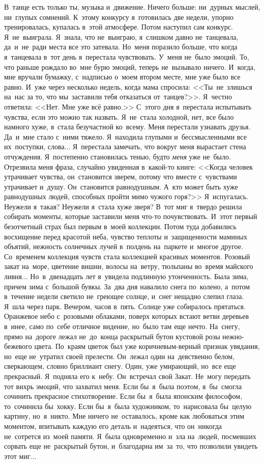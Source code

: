 В~танце есть только ты, музыка и~движение.
Ничего больше: ни~дурных мыслей, ни~глупых сомнений.
К~этому конкурсу я~готовилась две недели, упорно тренировалась, купалась в~этой атмосфере.
Потом наступил сам конкурс.
Я~не~выиграла.
Я~знала, что не~выиграю, я~слишком давно не~танцевала, да~и~не~ради места все это затевала.
Но~меня поразило больше, что когда я~танцевала в~тот день я~перестала чувствовать.
У~меня не~было эмоций.
То, что раньше рождало во~мне бурю эмоций, теперь не~вызывало ничего.
И~когда, мне вручали бумажку, с~надписью о~моем втором месте, мне уже было все равно.
И~уже через несколько недель, когда мама спросила: <<Ты~не~злишься на~нас за то, что мы~заставили тебя отказаться от~танцев?>>.
Я~честно ответила: <<Нет.
Мне уже всё равно.>>
С~этого дня я~перестала испытывать чувства, если это можно так назвать.
Я~не~стала холодной, нет, все было намного хуже, я~стала безучастной ко~всему.
Меня перестали узнавать друзья.
Да~и~мне стало с~ними тяжело.
Я~находила глупыми и~бессмысленными все их~поступки, слова... Я~перестала замечать, что вокруг меня вырастает стена отчуждения.
Я~постепенно становилась тенью, будто \textit{меня} уже не~было.
Отрезвила меня фраза, случайно увиденная в~какой-то книге: <<Когда человек утрачивает чувства, он~становится зверем, потому что вместе с~чувствами утрачивает и~душу.
Он~становится равнодушным.
А~кто может быть хуже равнодушных людей, способных пройти мимо чужого горя?>>
Я~испугалась.
Неужели я~такая? Неужели я~стала хуже зверя? В~тот миг я~твердо решила собирать моменты, которые заставили меня что-то почувствовать.
И~этот первый безотчетный страх был первым в~моей коллекции.
Потом туда добавились восхищение перед красотой неба, чувство теплоты и~защищенности маминых объятий, нежность солнечных лучей в~полдень на~паркете и~многое другое.
Со~временем коллекция чувств стала коллекцией красивых моментов.
Розовый закат на~море, цветение вишни, волосы на~ветру, тюльпаны во~время майского ливня... Но~в~двенадцать лет я~увидела подлинную утонченность.
Была зима, причем зима с~большой бувкы.
За~два дня навалило снега по~колено, а~потом в~течение недели светило не~греющее солнце, и~снег нещадно слепил глаза.
Я~шла через парк.
Вечером, часов в~пять.
Солнце уже собиралось прятаться.
Оранжевое небо с~розовыми облаками, поверх которых встают ветви деревьев в~инее, само по~себе отличное видение, но~было там еще нечто.
На~снегу, прямо на~дороге лежал не~до~конца раскрытый бутон кустовой розы нежно-бежевого цвета.
По~краям цветок был уже коричневым-верный признак увядания, но~еще не~утратил своей прелести.
Он~лежал один на~девственно белом, сверкающем, словно бриллиант снегу.
Один, уже умирающий, но~все еще прекрасный.
Я~подняла его к~небу.
Он~встречал свой Закат.
Не~могу передать тот вихрь эмоций, что захватил меня.
Если бы~я~была поэтом, я~бы~смогла сочинить прекрасное стихотворение.
Если бы~я~была японским философом, то~сочинила бы~хокку.
Если бы~я~была художником, то~нарисовала бы~целую картину, но~я~никто.
Мне ничего не~оставалось, кроме как любоваться этим моментом, впитывать каждую его деталь и~надеяться, что он~никогда не~сотрется из~моей памяти.
Я~была одновременно и~зла на~людей, посмевших сорвать еще не~раскрытый бутон, и~благодарна им~за~то, что позволили увидеть этот миг...

